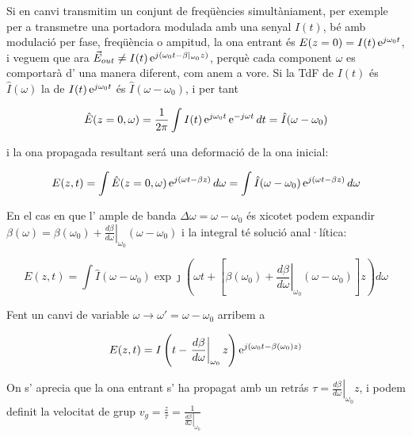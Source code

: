 Si en canvi transmitim un conjunt de freqüències simultàniament, per exemple per a transmetre una portadora modulada amb una senyal $I(t)$, bé amb modulació per fase, freqüència o ampitud, la ona entrant és $E(z=0) = I(t) \operatorname{e}^{j \omega _0 t}$, i veguem que ara $\vec E _{out} \neq I(t) \operatorname{e}^{j(\omega_0 t - \beta  \vert_{\omega _0} z)}$, perquè cada component $\omega$ es comportarà d' una manera diferent, com anem a vore. Si la TdF de $I(t)$ és $\hat I(\omega)$ la de $I(t)\operatorname{e}^{j \omega _0 t} $ és $\hat I(\omega - \omega _0)$, i per tant

\begin{equation}
  \hat E(z = 0, \omega ) = \frac{1}{2\pi} \int I(t) \operatorname{e}^{j\omega_0 t} \operatorname{e}^{-j\omega t} dt = \hat I(\omega - \omega _0)
\end{equation}

i la ona propagada resultant será una deformació de la ona inicial:

\begin{equation}
  E(z, t) = \int \hat E(z = 0, \omega) \operatorname{e}^{j(\omega t - \beta z)} d\omega = \int \hat I (\omega - \omega _0)  \operatorname{e}^{j(\omega t - \beta z)} d\omega
\end{equation}

En el cas en que l' ample de banda $\Delta \omega = \omega - \omega_0$ és xicotet podem expandir $\beta(\omega) = \beta ( \omega _0 ) + \left. \frac{d \beta}{d\omega}  \right\vert_{\omega _0} (\omega - \omega_0)$ i la integral té solució anal·lítica:

\begin{equation}
  E(z, t) = 
  \int \hat I ( \omega - \omega _0) \exp{ \jmath \left(\omega t + \left [\beta(\omega_0) + \left.\frac{d \beta}{d\omega} \right\vert_{\omega _0} (\omega - \omega_0) \right]z \right) }d\omega
\end{equation}

Fent un canvi de variable $ \omega \to \omega ' = \omega - \omega _0$ arribem a

\begin{equation}
  E(z, t) = I\left(t - \left. \frac{d\beta}{d \omega} \right \vert _{\omega _0} z\right) \operatorname{e}^{j(\omega_0 t - \beta(\omega _0) z )} 
\end{equation}

On s' aprecia que la ona entrant s' ha propagat amb un retrás $\tau = \left. \frac{d\beta}{d \omega} \right \vert _{\omega _0} z$, i podem definit la velocitat de grup $v_g = \frac{z}{\tau} = \frac{1}{\left. \frac{d\beta}{d \omega} \right \vert _{\omega _0} }$


